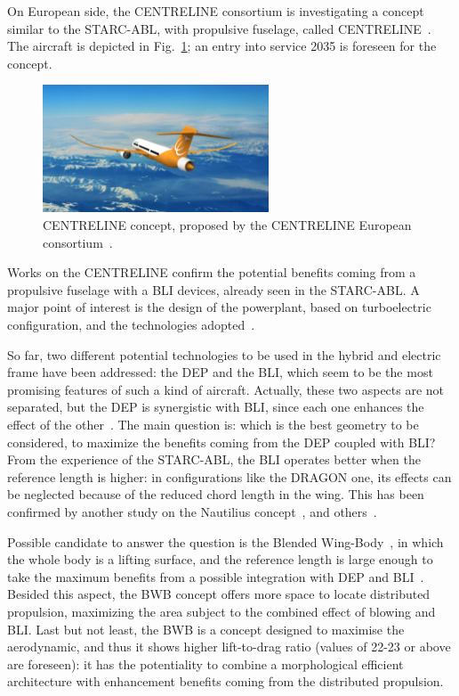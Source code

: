 On European side, the CENTRELINE consortium is investigating a concept similar to the STARC-ABL, with propulsive fuselage, called CENTRELINE~\cite{bib:seitz_2018, bib:habermann_2018, bib:bijewitz, bib:goraj}.
The aircraft is depicted in Fig.~\ref{fig:centreline}; an entry into service 2035 is foreseen for the concept.  
\begin{figure}[!h]
	\centering
	\includegraphics[keepaspectratio, width=0.6\textwidth]{images/chap1/centreline_concept.jpg}
	\caption{CENTRELINE concept, proposed by the CENTRELINE European consortium~\cite{bib:seitz_2018}.}
	\label{fig:centreline}
\end{figure}
Works on the CENTRELINE confirm the potential benefits coming from a propulsive fuselage with a BLI devices, already seen in the STARC-ABL. 
A major point of interest is the design of the powerplant, based on turboelectric configuration, and the technologies adopted~\cite{bib:bijewitz}. 

So far, two different potential technologies to be used in the hybrid and electric frame have been addressed: the DEP and the BLI, which seem to be the most promising features of such a kind of aircraft. 
Actually, these two aspects are not separated, but the DEP is synergistic with BLI, since each one enhances the effect of the other~\cite{bib:gohardani_book}. 
The main question is: which is the best geometry to be considered, to maximize the benefits coming from the DEP coupled with BLI? 
From the experience of the STARC-ABL, the BLI operates better when the reference length is higher: in configurations like the DRAGON one, its effects can be neglected because of the reduced chord length in the wing. 
This has been confirmed by another study on the Nautilius concept~\cite{bib:wiart}, and others~\cite{bib:arntz, bib:plas}. 

Possible candidate to answer the question is the Blended Wing-Body~\cite{bib:liebeck_1998}, in which the whole body is a lifting surface, and the reference length is large enough to take the maximum benefits from a possible integration with DEP and BLI~\cite{bib:bishara}. 
Besided this aspect, the BWB concept offers more space to locate distributed propulsion, maximizing the area subject to the combined effect of blowing and BLI. 
Last but not least, the BWB is a concept designed to maximise the aerodynamic, and thus it shows higher lift-to-drag ratio (values of 22-23 or above are foreseen): it has the potentiality to combine a morphological efficient architecture with enhancement benefits coming from the distributed propulsion. 

